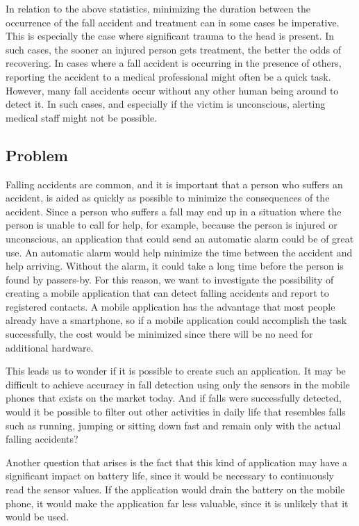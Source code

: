 \documentclass[12pt, a4paper, onecolumn]{article}
\begin{document}
			In relation to the above statistics, minimizing the duration between the occurrence of the fall accident and treatment can in some cases be imperative. This is especially the case where significant trauma to the head is present. In such cases, the sooner an injured person gets treatment, the better the odds of recovering. In cases where a fall accident is occurring in the presence of others, reporting the accident to a medical professional might often be a quick task. However, many fall accidents occur without any other human being around to detect it. In such cases, and especially if the victim is unconscious, alerting medical staff might not be possible.
		
		
		\subsection{Problem}
		
		Falling accidents are common, and it is important that a person who suffers an accident, is aided as quickly as possible to minimize the consequences of the accident. Since a person who suffers a fall may end up in a situation where the person is unable to call for help, for example, because the person is injured or unconscious, an application that could send an automatic alarm could be of great use. An automatic alarm would help minimize the time between the accident and help arriving. Without the alarm, it could take a long time before the person is found by passers-by. For this reason, we want to investigate the possibility of creating a mobile application that can detect falling accidents and report to registered contacts. A mobile application has the advantage that most people already have a smartphone, so if a mobile application could accomplish the task successfully, the cost would be minimized since there will be no need for additional hardware.
		
		This leads us to wonder if it is possible to create such an application. It may be difficult to achieve accuracy in fall detection using only the sensors in the mobile phones that exists on the market today. And if falls were successfully detected, would it be possible to filter out other activities in daily life that resembles falls such as running, jumping or sitting down fast and remain only with the actual falling accidents?
		
		Another question that arises is the fact that this kind of application may have a significant impact on battery life, since it would be necessary to continuously read the sensor values. If the application would drain the battery on the mobile phone, it would make the application far less valuable, since it is unlikely that it would be used.
		
\end{document}
